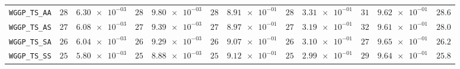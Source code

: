 \begin{xltabular}{\textwidth}{l||cC|cC|cC|cC|cC||c}
	\texttt{WGGP\_TS\_AA} & $ 28$ & $ \num{6.30e-03}$ & $ 28$ & $ \num{9.80e-03}$ & $ 28$ & $ \num{8.91e-01}$ & $ 28$ & $ \num{3.31e-01}$ & $ 31$ & $ \num{9.62e-01}$ & $ 28.6$  \\
	\texttt{WGGP\_TS\_AS} & $ 27$ & $ \num{6.08e-03}$ & $ 27$ & $ \num{9.39e-03}$ & $ 27$ & $ \num{8.97e-01}$ & $ 27$ & $ \num{3.19e-01}$ & $ 32$ & $ \num{9.61e-01}$ & $ 28.0$  \\
	\texttt{WGGP\_TS\_SA} & $ 26$ & $ \num{6.04e-03}$ & $ 26$ & $ \num{9.29e-03}$ & $ 26$ & $ \num{9.07e-01}$ & $ 26$ & $ \num{3.10e-01}$ & $ 27$ & $ \num{9.65e-01}$ & $ 26.2$  \\
	\texttt{WGGP\_TS\_SS} & $ 25$ & $ \num{5.80e-03}$ & $ 25$ & $ \num{8.88e-03}$ & $ 25$ & $ \num{9.12e-01}$ & $ 25$ & $ \num{2.99e-01}$ & $ 29$ & $ \num{9.64e-01}$ & $ 25.8$  \\
\end{xltabular}
